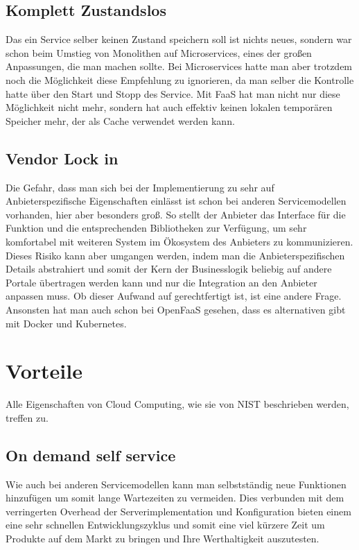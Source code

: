 \documentclass[12pt, a4paper]{article}
\begin{document}
\subsection{Komplett Zustandslos}
Das ein Service selber keinen Zustand speichern soll ist nichts neues, sondern war schon beim Umstieg von Monolithen auf Microservices, eines der großen Anpassungen, die man machen sollte.
Bei Microservices hatte man aber trotzdem noch die Möglichkeit diese Empfehlung zu ignorieren, da man selber die Kontrolle hatte über den Start und Stopp des Service.
Mit \ac{FaaS} hat man nicht nur diese Möglichkeit nicht mehr, sondern hat auch effektiv keinen lokalen temporären Speicher mehr, der als Cache verwendet werden kann.

\subsection{Vendor Lock in}
Die Gefahr, dass man sich bei der Implementierung zu sehr auf Anbieterspezifische Eigenschaften einlässt ist schon bei anderen Servicemodellen vorhanden, hier aber besonders groß.
So stellt der Anbieter das Interface für die Funktion und die entsprechenden Bibliotheken zur Verfügung, um sehr komfortabel mit weiteren System im Ökosystem des Anbieters zu kommunizieren.
Dieses Risiko kann aber umgangen werden, indem man die Anbieterspezifischen Details abstrahiert und somit der Kern der Businesslogik beliebig auf andere Portale übertragen werden kann und nur die Integration an den Anbieter anpassen muss.
Ob dieser Aufwand auf gerechtfertigt ist, ist eine andere Frage.
Ansonsten hat man auch schon bei OpenFaaS gesehen, dass es alternativen gibt mit Docker und Kubernetes.

\section{Vorteile}
Alle Eigenschaften von Cloud Computing, wie sie von \ac{NIST} beschrieben werden, treffen zu\cite{mell2011nist}.
\subsection{On demand self service}
Wie auch bei anderen Servicemodellen kann man selbstständig neue Funktionen hinzufügen um somit lange Wartezeiten zu vermeiden.
Dies verbunden mit dem verringerten Overhead der Serverimplementation und Konfiguration bieten einem eine sehr schnellen Entwicklungszyklus und somit eine viel kürzere Zeit um Produkte auf dem Markt zu bringen und Ihre Werthaltigkeit auszutesten.
\end{document}
